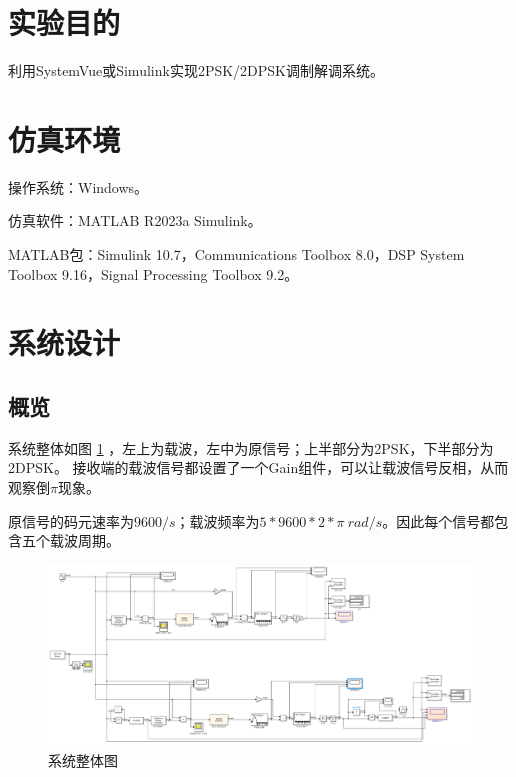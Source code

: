 \documentclass[11pt]{paper}
\begin{document}
\newpage
{}

\vspace{10mm}
\setcounter{tocdepth}{2}%
\tableofcontents

\newpage

\setlength{\baselineskip}{20pt}

\section{实验目的}

利用SystemVue或Simulink实现2PSK/2DPSK调制解调系统。

\section{仿真环境}

操作系统：Windows。

仿真软件：MATLAB R2023a Simulink。

MATLAB包：Simulink 10.7，Communications Toolbox 8.0，DSP System Toolbox 9.16，Signal Processing Toolbox 9.2。

\section{系统设计}

\subsection{概览}

系统整体如图 \ref{系统整体图} ，左上为载波，左中为原信号；上半部分为2PSK，下半部分为2DPSK。
接收端的载波信号都设置了一个Gain组件，可以让载波信号反相，从而观察倒$\pi$现象。

原信号的码元速率为$9600/s$；载波频率为$5*9600*2*\pi \ rad/s$。因此每个信号都包含五个载波周期。

\begin{figure}[ht]
    \centering
    \includegraphics[width=5.9in]{texture/design/all.png}
    \caption{系统整体图}
    \label{系统整体图}
\end{figure}
\end{document}
